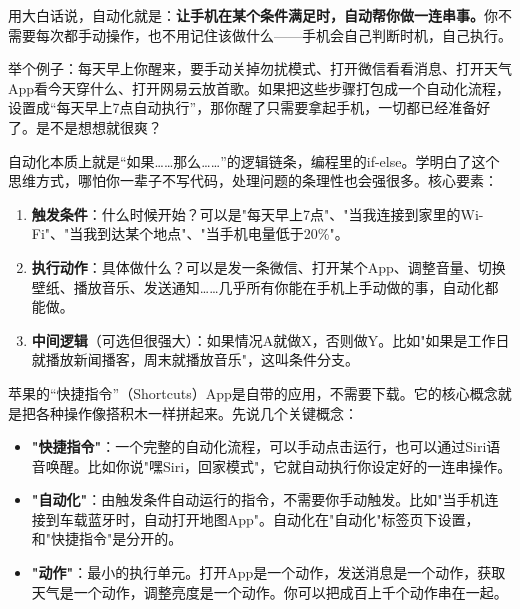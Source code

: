


用大白话说，自动化就是：\textbf{让手机在某个条件满足时，自动帮你做一连串事。}你不需要每次都手动操作，也不用记住该做什么——手机会自己判断时机，自己执行。

举个例子：每天早上你醒来，要手动关掉勿扰模式、打开微信看看消息、打开天气App看今天穿什么、打开网易云放首歌。如果把这些步骤打包成一个自动化流程，设置成“每天早上7点自动执行”，那你醒了只需要拿起手机，一切都已经准备好了。是不是想想就很爽？

自动化本质上就是“如果……那么……”的逻辑链条，编程里的if-else。学明白了这个思维方式，哪怕你一辈子不写代码，处理问题的条理性也会强很多。核心要素：

\begin{enumerate}
  \item \textbf{触发条件}：什么时候开始？可以是"每天早上7点"、"当我连接到家里的Wi-Fi"、"当我到达某个地点"、"当手机电量低于20\%"。
  \item \textbf{执行动作}：具体做什么？可以是发一条微信、打开某个App、调整音量、切换壁纸、播放音乐、发送通知……几乎所有你能在手机上手动做的事，自动化都能做。
  \item \textbf{中间逻辑}（可选但很强大）：如果情况A就做X，否则做Y。比如"如果是工作日就播放新闻播客，周末就播放音乐"，这叫条件分支。
\end{enumerate}


苹果的“快捷指令”（Shortcuts）App是自带的应用，不需要下载。它的核心概念就是把各种操作像搭积木一样拼起来。先说几个关键概念：

\begin{itemize}
  \item \textbf{"快捷指令"}：一个完整的自动化流程，可以手动点击运行，也可以通过Siri语音唤醒。比如你说"嘿Siri，回家模式"，它就自动执行你设定好的一连串操作。
  \item \textbf{"自动化"}：由触发条件自动运行的指令，不需要你手动触发。比如"当手机连接到车载蓝牙时，自动打开地图App"。自动化在"自动化"标签页下设置，和"快捷指令"是分开的。
  \item \textbf{"动作"}：最小的执行单元。打开App是一个动作，发送消息是一个动作，获取天气是一个动作，调整亮度是一个动作。你可以把成百上千个动作串在一起。
\end{itemize}

